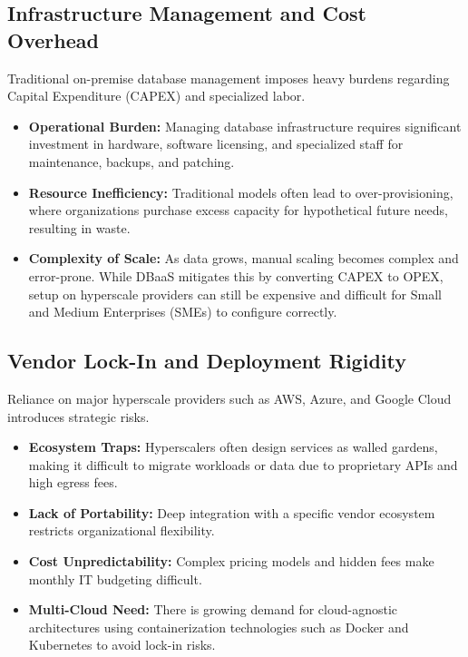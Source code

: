 \subsection{Infrastructure Management and Cost Overhead}

Traditional on-premise database management imposes heavy burdens regarding Capital Expenditure (CAPEX) and specialized labor.

\begin{itemize}
    \item \textbf{Operational Burden:} Managing database infrastructure requires significant investment in hardware, software licensing, and specialized staff for maintenance, backups, and patching.
    \item \textbf{Resource Inefficiency:} Traditional models often lead to over-provisioning, where organizations purchase excess capacity for hypothetical future needs, resulting in waste.
    \item \textbf{Complexity of Scale:} As data grows, manual scaling becomes complex and error-prone. While DBaaS mitigates this by converting CAPEX to OPEX, setup on hyperscale providers can still be expensive and difficult for Small and Medium Enterprises (SMEs) to configure correctly.
\end{itemize}

\subsection{Vendor Lock-In and Deployment Rigidity}

Reliance on major hyperscale providers such as AWS, Azure, and Google Cloud introduces strategic risks.

\begin{itemize}
    \item \textbf{Ecosystem Traps:} Hyperscalers often design services as walled gardens, making it difficult to migrate workloads or data due to proprietary APIs and high egress fees.
    \item \textbf{Lack of Portability:} Deep integration with a specific vendor ecosystem restricts organizational flexibility.
    \item \textbf{Cost Unpredictability:} Complex pricing models and hidden fees make monthly IT budgeting difficult.
    \item \textbf{Multi-Cloud Need:} There is growing demand for cloud-agnostic architectures using containerization technologies such as Docker and Kubernetes to avoid lock-in risks.
\end{itemize}

